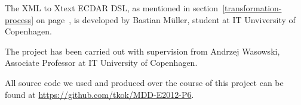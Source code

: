 The XML to Xtext ECDAR DSL, as mentioned in section~\ref{transformation-process} on page~\pageref{transformation-process}, is developed by Bastian M\"uller, student at IT Unviversity of Copenhagen.

The project has been carried out with supervision from Andrzej Wasowski,
Associate Professor at IT University of Copenhagen.

All source code we used and produced over the course of this project can be found
at \url{https://github.com/tkok/MDD-E2012-P6}.
